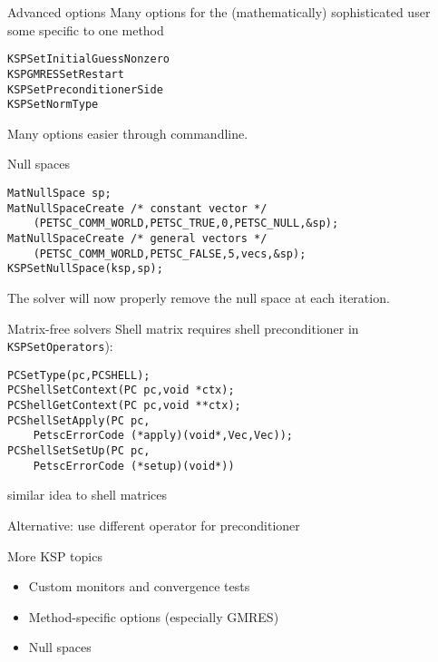 \begin{longversion}
\begin{numberedframe}{Advanced options}
Many options for the (mathematically) sophisticated user\\
some specific to one method
\begin{lstlisting}
KSPSetInitialGuessNonzero
KSPGMRESSetRestart
KSPSetPreconditionerSide
KSPSetNormType
\end{lstlisting}
Many options easier through commandline.
\end{numberedframe}

\begin{numberedframe}{Null spaces}

\begin{lstlisting}
MatNullSpace sp;
MatNullSpaceCreate /* constant vector */
    (PETSC_COMM_WORLD,PETSC_TRUE,0,PETSC_NULL,&sp);
MatNullSpaceCreate /* general vectors */
    (PETSC_COMM_WORLD,PETSC_FALSE,5,vecs,&sp);
KSPSetNullSpace(ksp,sp);
\end{lstlisting}

The solver will now properly remove the null space at each iteration.
\end{numberedframe}

\begin{numberedframe}{Matrix-free solvers}
Shell matrix requires shell preconditioner
in \lstinline{KSPSetOperators}):
\begin{lstlisting}
PCSetType(pc,PCSHELL);
PCShellSetContext(PC pc,void *ctx);
PCShellGetContext(PC pc,void **ctx);
PCShellSetApply(PC pc,
    PetscErrorCode (*apply)(void*,Vec,Vec));
PCShellSetSetUp(PC pc,
    PetscErrorCode (*setup)(void*))
\end{lstlisting}
similar idea to shell matrices

Alternative: use different operator for preconditioner
\end{numberedframe}

\end{longversion}

\begin{shortversion}

\begin{numberedframe}{More KSP topics}
  \begin{itemize}
  \item Custom monitors and convergence tests
  \item Method-specific options (especially GMRES)
  \item Null spaces
  \end{itemize}
\end{numberedframe}

\end{shortversion}

